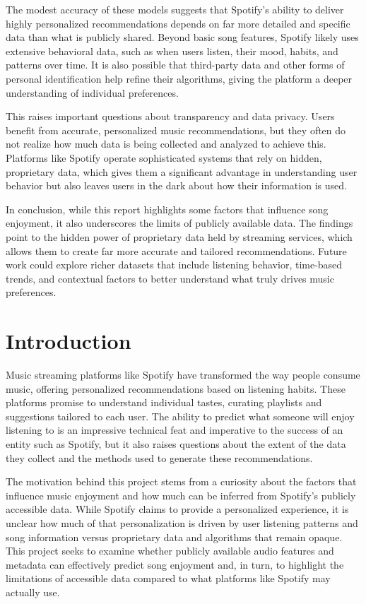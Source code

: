 \documentclass[11pt]{article}
\begin{document}
The modest accuracy of these models suggests that Spotify's ability to
deliver highly personalized recommendations depends on far more detailed
and specific data than what is publicly shared. Beyond basic song
features, Spotify likely uses extensive behavioral data, such as when
users listen, their mood, habits, and patterns over time. It is also
possible that third-party data and other forms of personal
identification help refine their algorithms, giving the platform a
deeper understanding of individual preferences.

This raises important questions about transparency and data privacy.
Users benefit from accurate, personalized music recommendations, but
they often do not realize how much data is being collected and analyzed
to achieve this. Platforms like Spotify operate sophisticated systems
that rely on hidden, proprietary data, which gives them a significant
advantage in understanding user behavior but also leaves users in the
dark about how their information is used.

In conclusion, while this report highlights some factors that influence
song enjoyment, it also underscores the limits of publicly available
data. The findings point to the hidden power of proprietary data held by
streaming services, which allows them to create far more accurate and
tailored recommendations. Future work could explore richer datasets that
include listening behavior, time-based trends, and contextual factors to
better understand what truly drives music preferences.

    \section{Introduction}\label{introduction}

Music streaming platforms like Spotify have transformed the way people
consume music, offering personalized recommendations based on listening
habits. These platforms promise to understand individual tastes,
curating playlists and suggestions tailored to each user. The ability to
predict what someone will enjoy listening to is an impressive technical
feat and imperative to the success of an entity such as Spotify, but it
also raises questions about the extent of the data they collect and the
methods used to generate these recommendations.

The motivation behind this project stems from a curiosity about the
factors that influence music enjoyment and how much can be inferred from
Spotify's publicly accessible data. While Spotify claims to provide a
personalized experience, it is unclear how much of that personalization
is driven by user listening patterns and song information versus
proprietary data and algorithms that remain opaque. This project seeks
to examine whether publicly available audio features and metadata can
effectively predict song enjoyment and, in turn, to highlight the
limitations of accessible data compared to what platforms like Spotify
may actually use.
\end{document}
